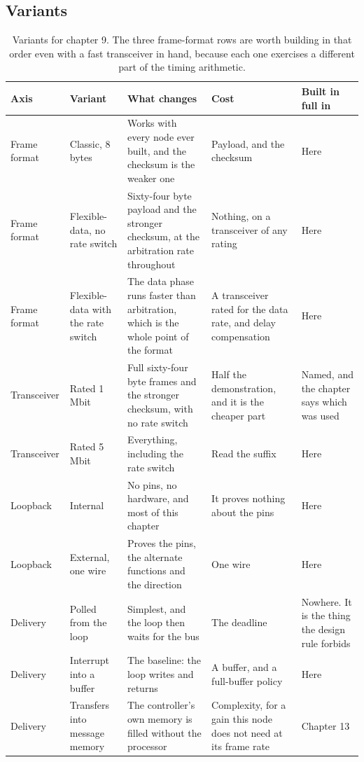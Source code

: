 \subsection*{Variants}

\begin{table}[H]\centering\small
\begin{tabular}{p{24mm}p{26mm}p{44mm}p{22mm}p{20mm}}
\toprule
Axis & Variant & What changes & Cost & Built in full in \\
\midrule
Frame format & Classic, 8 bytes & Works with every node ever built, and the checksum is the weaker one & Payload, and the checksum & Here \\
Frame format & Flexible-data, no rate switch & Sixty-four byte payload and the stronger checksum, at the arbitration rate throughout & Nothing, on a transceiver of any rating & Here \\
Frame format & Flexible-data with the rate switch & The data phase runs faster than arbitration, which is the whole point of the format & A transceiver rated for the data rate, and delay compensation & Here \\
Transceiver & Rated 1 Mbit & Full sixty-four byte frames and the stronger checksum, with no rate switch & Half the demonstration, and it is the cheaper part & Named, and the chapter says which was used \\
Transceiver & Rated 5 Mbit & Everything, including the rate switch & Read the suffix & Here \\
Loopback & Internal & No pins, no hardware, and most of this chapter & It proves nothing about the pins & Here \\
Loopback & External, one wire & Proves the pins, the alternate functions and the direction & One wire & Here \\
Delivery & Polled from the loop & Simplest, and the loop then waits for the bus & The deadline & Nowhere. It is the thing the design rule forbids \\
Delivery & Interrupt into a buffer & The baseline: the loop writes and returns & A buffer, and a full-buffer policy & Here \\
Delivery & Transfers into message memory & The controller's own memory is filled without the processor & Complexity, for a gain this node does not need at its frame rate & Chapter 13 \\
\bottomrule
\end{tabular}
\caption{Variants for chapter 9. The three frame-format rows are worth building in that order even with a fast transceiver in hand, because each one exercises a different part of the timing arithmetic.}
\end{table}

